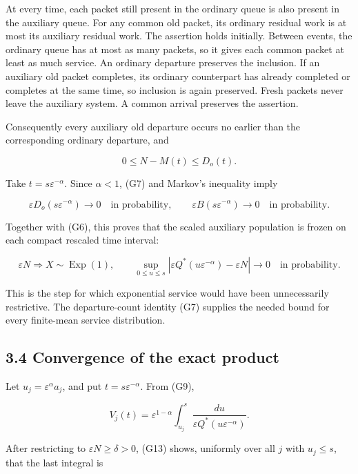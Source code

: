 \documentclass[
  11pt,
  a4paper,
]{scrartcl}
\begin{document}
At every time, each packet still present in the ordinary queue is also
present in the auxiliary queue. For any common old packet, its ordinary
residual work is at most its auxiliary residual work. The assertion
holds initially. Between events, the ordinary queue has at most as many
packets, so it gives each common packet at least as much service. An
ordinary departure preserves the inclusion. If an auxiliary old packet
completes, its ordinary counterpart has already completed or completes
at the same time, so inclusion is again preserved. Fresh packets never
leave the auxiliary system. A common arrival preserves the assertion.

Consequently every auxiliary old departure occurs no earlier than the
corresponding ordinary departure, and

\[
0\leq N-M(t)\leq D_o(t).
\tag{G11}
\]

Take \(t=s\varepsilon^{-\alpha}\). Since \(\alpha<1\), (G7) and Markov's
inequality imply

\[
\varepsilon D_o(s\varepsilon^{-\alpha})\to0
\quad\text{in probability},
\qquad
\varepsilon B(s\varepsilon^{-\alpha})\to0
\quad\text{in probability}.
\tag{G12}
\]

Together with (G6), this proves that the scaled auxiliary population is
frozen on each compact rescaled time interval:

\[
\varepsilon N\Rightarrow X\sim\operatorname{Exp}(1),\qquad
\sup_{0\leq u\leq s}
|\varepsilon Q^*(u\varepsilon^{-\alpha})-\varepsilon N|
\to0\quad\text{in probability}.
\tag{G13}
\]

This is the step for which exponential service would have been
unnecessarily restrictive. The departure-count identity (G7) supplies
the needed bound for every finite-mean service distribution.

\subsection{3.4 Convergence of the exact
product}\label{convergence-of-the-exact-product}

Let \(u_j=\varepsilon^\alpha a_j\), and put
\(t=s\varepsilon^{-\alpha}\). From (G9),

\[
V_j(t)=\varepsilon^{1-\alpha}
\int_{u_j}^s\frac{du}{\varepsilon Q^*(u\varepsilon^{-\alpha})}.
\tag{G14}
\]

After restricting to \(\varepsilon N\geq\delta>0\), (G13) shows,
uniformly over all \(j\) with \(u_j\leq s\), that the last integral is
\end{document}
